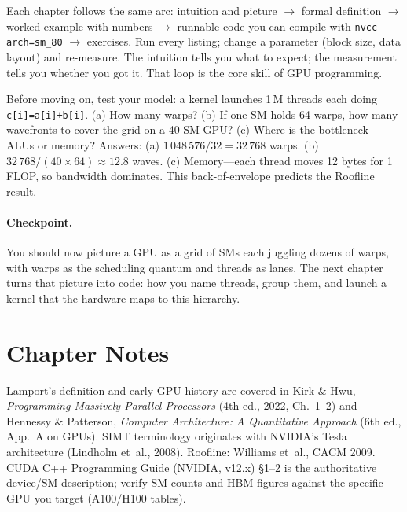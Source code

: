 \begin{remark}
Each chapter follows the same arc: intuition and picture $\to$ formal definition $\to$ worked example with numbers $\to$ runnable code you can compile with \texttt{nvcc -arch=sm\_80} $\to$ exercises. Run every listing; change a parameter (block size, data layout) and re-measure. The intuition tells you what to expect; the measurement tells you whether you got it. That loop is the core skill of GPU programming.
\end{remark}

\begin{example}
Before moving on, test your model: a kernel launches 1\,M threads each doing \texttt{c[i]=a[i]+b[i]}. (a) How many warps? (b) If one SM holds 64 warps, how many wavefronts to cover the grid on a 40-SM GPU? (c) Where is the bottleneck---ALUs or memory? Answers: (a) $1\,048\,576/32=32\,768$ warps. (b) $32\,768/(40\times64)\approx12.8$ waves. (c) Memory---each thread moves 12 bytes for 1 FLOP, so bandwidth dominates. This back-of-envelope predicts the Roofline result.
\end{example}

\paragraph{Checkpoint.} You should now picture a GPU as a grid of SMs each juggling dozens of warps, with warps as the scheduling quantum and threads as lanes. The next chapter turns that picture into code: how you name threads, group them, and launch a kernel that the hardware maps to this hierarchy.

\smallskip

\section*{Chapter Notes}
Lamport's definition and early GPU history are covered in Kirk \& Hwu, \emph{Programming Massively Parallel Processors} (4th ed., 2022, Ch.~1--2) and Hennessy \& Patterson, \emph{Computer Architecture: A Quantitative Approach} (6th ed., App.~A on GPUs). SIMT terminology originates with NVIDIA's Tesla architecture (Lindholm et~al., 2008). Roofline: Williams et~al., CACM 2009. CUDA C++ Programming Guide (NVIDIA, v12.x) \S1--2 is the authoritative device/SM description; verify SM counts and HBM figures against the specific GPU you target (A100/H100 tables).
